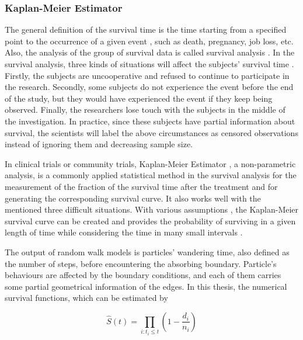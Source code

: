 \subsubsection{Kaplan-Meier Estimator}

The general definition of the survival time is the time starting from
a specified point to the occurrence of a given event
\cite{bewick2004statistics}, such as death, pregnancy, job loss,
etc. Also, the analysis of the group of survival data is called
survival analysis \cite{altman1990practical}. In the survival
analysis, three kinds of situations will affect the subjects' survival
time \cite{goel2010understanding}. Firstly, the subjects are
uncooperative and refused to continue to participate in the
research. Secondly, some subjects do not experience the event before
the end of the study, but they would have experienced the event if
they keep being observed. Finally, the researchers lose touch with the
subjects in the middle of the investigation. In practice, since these
subjects have partial information about survival, the scientists will
label the above circumstances as censored observations
\cite{bewick2004statistics} instead of ignoring them and decreasing
sample size. 

In clinical trials or community trials, Kaplan-Meier Estimator
\cite{kaplan1958nonparametric}, a non-parametric analysis, is a
commonly applied statistical method in the survival analysis for the
measurement of the fraction of the survival time after the treatment
\cite{aalen2008survival} and for generating the corresponding survival
curve. It also works well with the mentioned three difficult
situations. With various assumptions \cite{etikan2017kaplan}
\cite{goel2010understanding}, the Kaplan-Meier survival curve can be
created and provides the probability of surviving in a given length of
time while considering the time in many small intervals
\cite{altman1990practical}.


The output of random walk models is particles' wandering time, also
defined as the number of steps, before encountering the absorbing
boundary. Particle's behaviours are affected by the boundary
conditions, and each of them carries some partial geometrical
information of the edges. In this thesis, the numerical survival
functions, which can be estimated by \cite{aalen2008survival}

\begin{equation}
  \widehat{S}(t) = \prod_{i:t_i \leq t} (1 - \frac{d_i}{n_i})
\end{equation}

